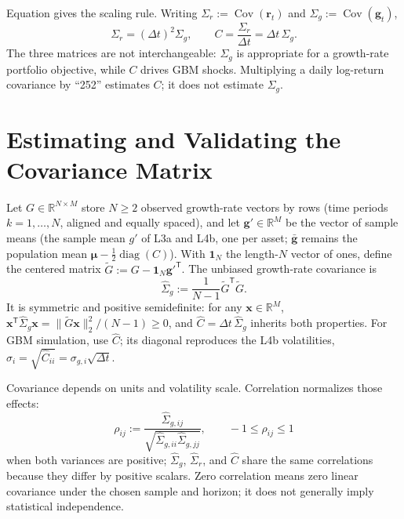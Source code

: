 \documentclass[11pt]{article}
\newcommand{\Cov}{\operatorname{Cov}}
\newcommand{\R}{\mathbb{R}}
\begin{document}
Equation  gives the scaling rule. Writing $\Sigma_r:=\Cov(\mathbf r_t)$ and $\Sigma_g:=\Cov(\mathbf g_t)$,
\begin{equation}
  \label{eq:three-covariances}
  \Sigma_r=(\Delta t)^2\Sigma_g,
  \qquad
  C=\frac{\Sigma_r}{\Delta t}=\Delta t\,\Sigma_g.
\end{equation}
The three matrices are not interchangeable: $\Sigma_g$ is appropriate for a growth-rate portfolio objective, while $C$ drives GBM shocks. Multiplying a daily log-return covariance by ``252'' estimates $C$; it does not estimate $\Sigma_g$.

\section{Estimating and Validating the Covariance Matrix}

Let $G\in\R^{N\times M}$ store $N\geq2$ observed growth-rate vectors by rows (time periods $k=1,\ldots,N$, aligned and equally spaced), and let $\mathbf g'\in\R^M$ be the vector of sample means (the sample mean $g'$ of L3a and L4b, one per asset; $\bar{\mathbf g}$ remains the population mean $\boldsymbol\mu-\tfrac12\operatorname{diag}(C)$). With $\mathbf1_N$ the length-$N$ vector of ones, define the centered matrix $\widetilde G:=G-\mathbf1_N\mathbf g'^{\mathsf T}$. The unbiased growth-rate covariance is
\begin{equation}
  \label{eq:sample-covariance}
  \widehat\Sigma_g:=
  \frac{1}{N-1}\widetilde G^{\mathsf T}\widetilde G.
\end{equation}
It is symmetric and positive semidefinite: for any $\mathbf x\in\R^M$, $\mathbf x^{\mathsf T}\widehat\Sigma_g\mathbf x=\lVert\widetilde G\mathbf x\rVert_2^2/(N-1)\geq0$, and $\widehat C=\Delta t\,\widehat\Sigma_g$ inherits both properties. For GBM simulation, use $\widehat C$; its diagonal reproduces the L4b volatilities, $\widehat\sigma_i=\sqrt{\widehat C_{ii}}=\sigma_{g,i}\sqrt{\Delta t}$.

Covariance depends on units and volatility scale. Correlation normalizes those effects:
\begin{equation}
  \label{eq:correlation}
  \rho_{ij}:=\frac{\widehat\Sigma_{g,ij}}
  {\sqrt{\widehat\Sigma_{g,ii}\widehat\Sigma_{g,jj}}},
  \qquad -1\leq\rho_{ij}\leq1
\end{equation}
when both variances are positive; $\widehat\Sigma_g$, $\widehat\Sigma_r$, and $\widehat C$ share the same correlations because they differ by positive scalars. Zero correlation means zero linear covariance under the chosen sample and horizon; it does not generally imply statistical independence.
\end{document}
